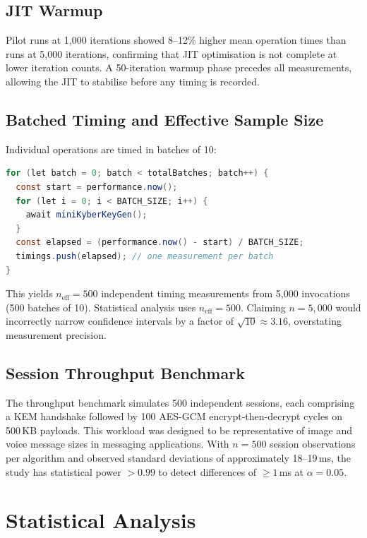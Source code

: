 \documentclass[12pt,a4paper]{report}
\begin{document}
\subsection{JIT Warmup}

Pilot runs at 1,000 iterations showed 8--12\% higher mean operation times than runs
at 5,000 iterations, confirming that JIT optimisation is not complete at lower
iteration counts. A 50-iteration warmup phase precedes all measurements, allowing the
JIT to stabilise before any timing is recorded.

\subsection{Batched Timing and Effective Sample Size}

Individual operations are timed in batches of 10:

\begin{lstlisting}[language=Java, caption={Batched timing in benchmark.ts}]
for (let batch = 0; batch < totalBatches; batch++) {
  const start = performance.now();
  for (let i = 0; i < BATCH_SIZE; i++) {
    await miniKyberKeyGen();
  }
  const elapsed = (performance.now() - start) / BATCH_SIZE;
  timings.push(elapsed); // one measurement per batch
}
\end{lstlisting}

This yields $n_{\text{eff}} = 500$ independent timing measurements from 5,000
invocations (500 batches of 10). Statistical analysis uses $n_{\text{eff}} = 500$.
Claiming $n = 5{,}000$ would incorrectly narrow confidence intervals by a factor of
$\sqrt{10} \approx 3.16$, overstating measurement precision.

\subsection{Session Throughput Benchmark}

The throughput benchmark simulates 500 independent sessions, each comprising a KEM
handshake followed by 100 AES-GCM encrypt-then-decrypt cycles on 500\,KB payloads.
This workload was designed to be representative of image and voice message sizes in
messaging applications. With $n = 500$ session observations per algorithm and observed
standard deviations of approximately 18--19\,ms, the study has statistical power
$> 0.99$ to detect differences of $\geq 1$\,ms at $\alpha = 0.05$.

\section{Statistical Analysis}
\end{document}
